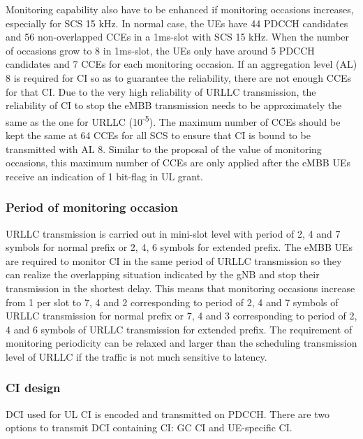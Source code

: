 \documentclass{ieeeaccess}
\begin{document}
Monitoring capability also have to be enhanced if monitoring occasions increases, especially for SCS 15 kHz. In normal case, the UEs have 44 PDCCH candidates and 56 non-overlapped CCEs in a 1ms-slot with SCS 15 kHz. When the number of occasions grow to 8 in 1ms-slot, the UEs only have around 5 PDCCH candidates and 7 CCEs for each monitoring occasion. If an aggregation level (AL) 8 is required for CI so as to guarantee the reliability, there are not enough CCEs for that CI. Due to the very high reliability of URLLC transmission, the reliability of CI to stop the eMBB transmission needs to be approximately the same as the one for URLLC (10\textsuperscript{-5}). The maximum number of CCEs should be kept the same at 64 CCEs for all SCS to ensure that CI is bound to be transmitted with AL 8. Similar to the proposal of the value of monitoring occasions, this maximum number of CCEs are only applied after the eMBB UEs receive an indication of 1 bit-flag in UL grant.

\subsubsection{Period of monitoring occasion}
URLLC transmission is carried out in mini-slot level with period of 2, 4 and 7 symbols for normal prefix or 2, 4, 6 symbols for extended prefix. The eMBB UEs are required to monitor CI in the same period of URLLC transmission so they can realize the overlapping situation indicated by the gNB and stop their transmission in the shortest delay. This means that monitoring occasions increase from 1 per slot to 7, 4 and 2 corresponding to period of 2, 4 and 7 symbols of URLLC transmission for normal prefix or 7, 4 and 3 corresponding to period of 2, 4 and 6 symbols of URLLC transmission for extended prefix. The requirement of monitoring periodicity can be relaxed and larger than the scheduling transmission level of URLLC if the traffic is not much sensitive to latency. 

\subsubsection {CI design}

DCI used for UL CI is encoded and transmitted on PDCCH. There are two options to transmit DCI containing CI: GC CI and UE-specific CI.
\end{document}
